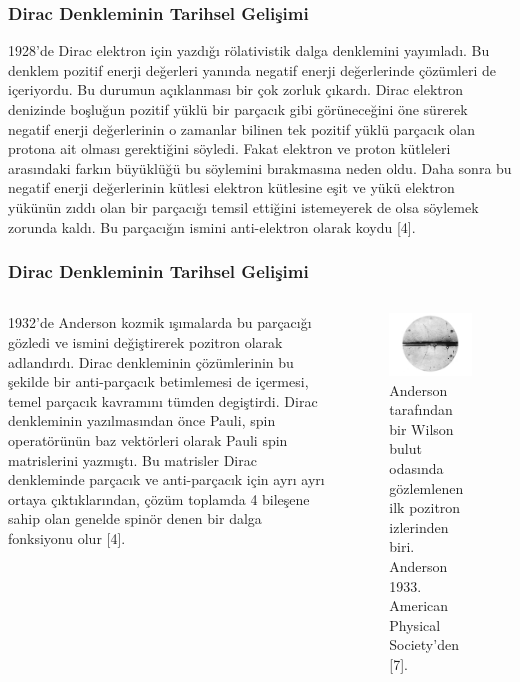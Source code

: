 \documentclass[aspectratio=169,10pt]{beamer}
\begin{document}
\begin{frame}[allowframebreaks]
\frametitle{Dirac Denkleminin Tarihsel Gelişimi}

1928’de Dirac elektron için yazdığı rölativistik dalga denklemini yayımladı. Bu denklem pozitif enerji değerleri yanında negatif enerji değerlerinde çözümleri de içeriyordu. Bu durumun açıklanması bir çok zorluk çıkardı. Dirac elektron denizinde boşluğun pozitif yüklü bir parçacık gibi görüneceğini öne sürerek negatif enerji değerlerinin o zamanlar bilinen tek pozitif yüklü parçacık olan protona ait olması gerektiğini söyledi. Fakat elektron ve proton kütleleri
arasındaki farkın büyüklüğü bu söylemini bırakmasına neden oldu. Daha sonra bu negatif enerji değerlerinin kütlesi elektron kütlesine eşit ve yükü elektron yükünün zıddı olan bir parçacığı temsil ettiğini istemeyerek de olsa söylemek zorunda kaldı. Bu parçacığın ismini anti-elektron olarak koydu [4].



\end{frame}

\begin{frame}[allowframebreaks]
\frametitle{Dirac Denkleminin Tarihsel Gelişimi}

\begin{columns}



1932’de Anderson kozmik ışımalarda bu parçacığı gözledi ve ismini değiştirerek pozitron olarak adlandırdı. Dirac denkleminin çözümlerinin bu şekilde bir anti-parçacık betimlemesi de içermesi, temel parçacık kavramını tümden degiştirdi. Dirac denkleminin yazılmasından önce Pauli, spin operatörünün baz vektörleri olarak Pauli spin matrislerini yazmıştı. Bu matrisler Dirac denkleminde parçacık ve anti-parçacık için ayrı ayrı ortaya çıktıklarından, çözüm toplamda 4 bileşene sahip olan genelde spinör denen bir dalga fonksiyonu olur [4].


\centering
 \begin{figure}
\includegraphics[width=5cm]{pozitron..PNG}
\caption*{Anderson tarafından bir Wilson bulut odasında gözlemlenen ilk pozitron izlerinden biri. Anderson 1933. American Physical Society'den [7].}
	\end{figure}
	


\end{columns}
\end{frame}
\end{document}
